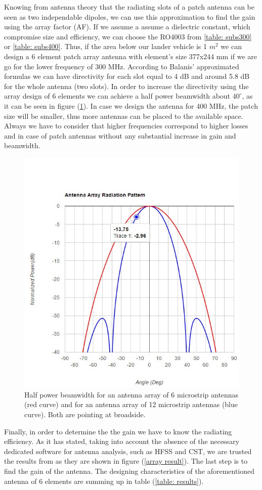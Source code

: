 \noindent
Knowing from antenna theory that the radiating slots of a patch antenna can be seen as two independable dipoles, we can use this approximation to find the gain using the array factor (AF). If we assume a assume a dielectric constant, which compromise size and efficiency, we can choose the RO4003 from \ref{table: subs300} or \ref{table: subs400}. Thus, if the area below our lander vehicle is 1 $m^2$ we can design a 6 element patch array antenna with element's size 377x244 mm if we are go for the lower frequency of 300 MHz. According to Balanis' approximated formulas we can have directivity for each slot equal to 4 dB and around 5.8 dB for the whole antenna (two slots). In order to increase the directivity using the array design of 6 elements we can achieve a half power beamwidth about $40^{\circ}$, as it can be seen in figure (\ref{array}). In case we design the antenna for 400 MHz, the patch size will be smaller, thus more antennas can be placed to the available space. Always we have to consider that higher frequencies correspond to higher losses and in case of patch antennas without any substantial increase in gain and beamwidth.

\begin{figure}[htb]
\centering
\includegraphics[trim={0 0 0 2cm},clip,width=.7\textwidth]{figures/Yannis/2results.jpg}
\caption{Half power beamwidth for an antenna array of 6 microstrip antennas (red curve) and for an antenna array of 12 microstrip antennas (blue curve). Both are pointing at broadside.}
\label{array}
\end{figure}

Finally, in order to determine the the gain we have to know the radiating efficiency. As it has stated, taking into account the absence of the necessary dedicated software for antenna analysis, such as HFSS and CST, we are trusted the results from \cite{substrates} as they are shown in figure (\ref{array result}). The last step is to find the gain of the antenna. The designing characteristics of the aforementioned antenna of 6 elements are summing up in table (\ref{table: results}).

